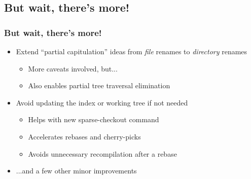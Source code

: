 \documentclass[compress,t]{beamer}
\begin{document}
\begin{frame}
{\begin{center}
\begin{minipage}{0.88\textwidth}
\begin{block}{}
    \end{block}
    \end{minipage}
    \end{center}
    \vfill
  }

\end{frame}


\subsection[Honing]{But wait, there's more!}
\begin{frame}
  \frametitle{But wait, there's more!}

  \begin{itemize}[<+(1)->]

    \item Extend ``partial capitulation'' ideas from \textit{file}
          renames to \textit{directory} renames

      \begin{itemize}
        \item More caveats involved, but...
        \item Also enables partial tree traversal elimination
      \end{itemize}

    \item Avoid updating the index or working tree if not needed

      \begin{itemize}
        \item Helps with new sparse-checkout command
        \item Accelerates rebases and cherry-picks
        \item Avoids unnecessary recompilation after a rebase
      \end{itemize}

    \item ...and a few other minor improvements

  \end{itemize}

\end{frame}
\end{document}
